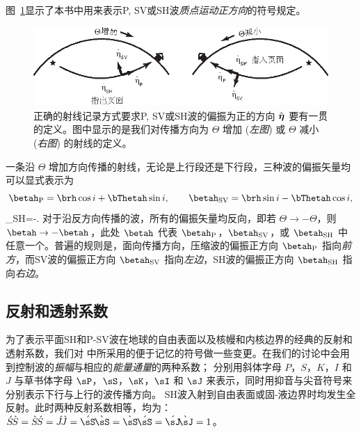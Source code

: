 图~\ref{12.fig.polarization}显示了本书中用来表示P, SV或SH波{\em 质点运动正方向\/}的符号规定。
%
%
%
%
\begin{figure}
\begin{center}
\includegraphics{../figures/chap12/fig05.eps}
\end{center}
\caption[polarizationvectors]{\label{12.fig.polarization}
正确的射线记录方式要求P, SV或SH波的偏振为正的方向
$\hat{\mbox{\boldmath $\eta$}}$ 要有一贯的定义。图中显示的是我们对传播方向为
$\Theta$ 增加 ({\em 左图\/}) 或 $\Theta$ 减小 ({\em 右图\/}) 的射线的定义。}
\end{figure}
一条沿 $\Theta$ 增加方向传播的射线，无论是上行段还是下行段，三种波的偏振矢量均可以显式表示为
\[
\betah_{\rm P}=\brh\cos i+\bThetah\sin i,
\qquad
\betah_{\rm SV}=\brh\sin i-\bThetah\cos i,
\]
\eq \label{12.polar}
\qquad\qquad\qquad\qquad\betah_{\rm SH}=-\bPhih.
\en
对于沿反方向传播的波，所有的偏振矢量均反向，即若 $\Theta\rightarrow -\Theta$，则 $\betah\rightarrow -\betah$，此处 $\betah$
代表 $\betah_{\rm P}$，$\betah_{\rm SV}$，或 $\betah_{\rm SH}$ 中任意一个。普遍的规则是，面向传播方向，压缩波的偏振正方向
$\betah_{\rm P}$ 指向{\em 前方\/}，而SV波的偏振正方向 $\betah_{\rm SV}$ 指向{\em 左边\/}，SH波的偏振正方向 $\betah_{\rm SH}$ 指向{\em 右边\/}。
%
%
%

\subsection{反射和透射系数}
%
%
\label{12.sec.scatmat}

为了表示平面SH和P-SV波在地球的自由表面以及核幔和内核边界的经典的反射和透射系数，我们对 \textcite{aki&richards80}中所采用的便于记忆的符号做一些变更。在我们的讨论中会用到控制波的{\em 振幅\/}与相应的{\em 能量通量\/}的两种系数；
%
%
% 
% 
分别用斜体字母 $P$，$S$，$K$，$I$ 和 $J$ 与草书体字母 $\sP$，$\sS$，$\sK$，$\sI$ 和 $\sJ$ 来表示，同时用抑音与尖音符号来分别表示下行与上行的波传播方向。
SH波入射到自由表面或固-液边界时均发生全反射。此时两种反射系数相等，均为：
$\acute{S}\hspace{-0.4 mm}\grave{S}=
\grave{S}\hspace{-0.4 mm}\acute{S}=
\acute{J}\hspace{-0.5 mm}\grave{J}=
\acute{\sS}\hspace{-0.3 mm}\grave{\sS}=
\grave{\sS}\hspace{-0.3 mm}\acute{\sS}=
\acute{\sJ}\hspace{-0.8 mm}\grave{\sJ}=1$。

